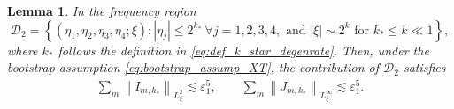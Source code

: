 \documentclass[reqno,english,11pt]{amsart}
\newcommand{\eps}{\varepsilon}
\newcommand{\snorm}[1]{\left\|#1\right\|}
\newtheorem{lemma}[theorem]{Lemma}
\theoremstyle{definition}
\numberwithin{equation}{section}
\begin{document}
\begin{lemma}\label{prop:deg_case_2}
    In the frequency region
    \begin{equation*}
        \mathcal{D}_2=\left\{ (\eta_1,\eta_2,\eta_3,\eta_4; \xi) : |\eta_j| \le 2^{k_*} \ \forall j=1,2,3,4, \text{ and } |\xi| \sim 2^{k} \text{ for }k_*\leq k\ll 1 \right\},
    \end{equation*}
    where $k_*$ follows the definition in \eqref{eq:def_k_star_degenrate}. Then, under the bootstrap assumption \eqref{eq:bootstrap_assump_XT},  the contribution of $\mathcal{D}_2$ satisfies
    \begin{align*}
        \sum_m\snorm{I_{m,k_*}}_{L^2_\xi}\lesssim \eps_1^5,\qquad\sum_m\snorm{J_{m,k_*}}_{L^\infty_\xi}\lesssim \eps_1^5.
    \end{align*}
\end{lemma}
\end{document}
